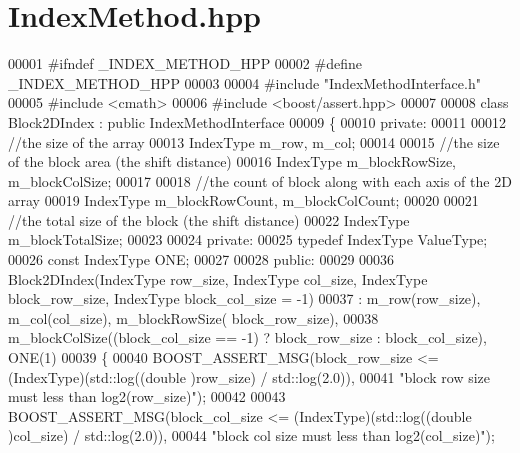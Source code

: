 \section{Index\-Method.\-hpp}
\label{_index_method_8hpp}

\begin{DoxyCode}
00001 \textcolor{preprocessor}{#ifndef \_INDEX\_METHOD\_HPP}
00002 \textcolor{preprocessor}{}\textcolor{preprocessor}{#define \_INDEX\_METHOD\_HPP}
00003 \textcolor{preprocessor}{}
00004 \textcolor{preprocessor}{#include "IndexMethodInterface.h"}
00005 \textcolor{preprocessor}{#include <cmath>}
00006 \textcolor{preprocessor}{#include <boost/assert.hpp>}
00007 
00008 \textcolor{keyword}{class }Block2DIndex : \textcolor{keyword}{public} IndexMethodInterface
00009 \{
00010 \textcolor{keyword}{private}:
00011 
00012         \textcolor{comment}{//the size of the array}
00013         IndexType m\_row, m\_col;
00014 
00015         \textcolor{comment}{//the size of the block area (the shift distance)}
00016         IndexType m\_blockRowSize, m\_blockColSize;
00017 
00018         \textcolor{comment}{//the count of block along with each axis of the 2D array}
00019         IndexType m\_blockRowCount, m\_blockColCount;
00020 
00021         \textcolor{comment}{//the total size of the block (the shift distance)}
00022         IndexType m\_blockTotalSize;
00023 
00024 \textcolor{keyword}{private}:
00025         \textcolor{keyword}{typedef} IndexType ValueType;
00026         \textcolor{keyword}{const} IndexType ONE;
00027 
00028 \textcolor{keyword}{public}:
00029 
00036         Block2DIndex(IndexType row\_size, IndexType col\_size, IndexType 
      block\_row\_size, IndexType block\_col\_size = -1)
00037                 : m\_row(row\_size), m\_col(col\_size), m\_blockRowSize(
      block\_row\_size),
00038                         m\_blockColSize((block\_col\_size == -1) ? block\_row\_size 
      : block\_col\_size), ONE(1)
00039         \{
00040                 BOOST\_ASSERT\_MSG(block\_row\_size <= (IndexType)(std::log((\textcolor{keywordtype}{double}
      )row\_size) / std::log(2.0)),
00041                         \textcolor{stringliteral}{"block row size must less than log2(row\_size)"});
00042 
00043                 BOOST\_ASSERT\_MSG(block\_col\_size <= (IndexType)(std::log((\textcolor{keywordtype}{double}
      )col\_size) / std::log(2.0)),
00044                         \textcolor{stringliteral}{"block col size must less than log2(col\_size)"});

\end{DoxyCode}
